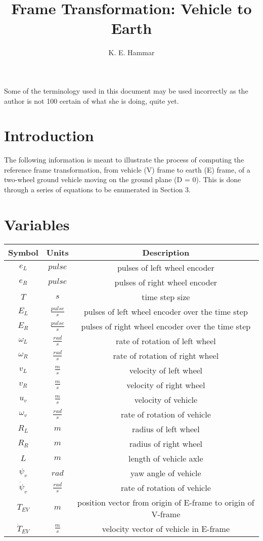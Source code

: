 \documentclass[12pt]{article}
\begin{document}
	\title{Frame Transformation: Vehicle to Earth}
	\author{K. E. Hammar}
	\maketitle
	Some of the terminology used in this document may be used incorrectly as the author is not 100\text{\%} certain of what she is doing, quite yet. 
	\section{Introduction}
		The following information is meant to illustrate the process of computing the reference frame transformation, from vehicle (V) frame to earth (E) frame, of a two-wheel ground vehicle moving on the ground plane (D = 0). This is done through a series of equations to be enumerated in Section 3.
	\section{Variables}
		\begin{table}[hbt]
			\begin{center}
				\begin{tabular}{|c|c|c|}
					\hline
					Symbol & Units & Description \\ \hline
					$e_L$ & $pulse$ & pulses of left wheel encoder\\
					$e_R$ & $pulse$ & pulses of right wheel encoder\\
					$T$ & $s$ & time step size\\
					$E_L$ & $\frac{pulse}{s}$ & pulses of left wheel encoder over the time step \\
					$E_R$ & $\frac{pulse}{s}$ & pulses of right wheel encoder over the time step \\
					$\omega_L$ & $\frac{rad}{s}$ &rate of rotation of left wheel \\
					$\omega_R$ & $\frac{rad}{s}$ & rate of rotation of right wheel \\
					$v_L$ & $\frac{m}{s}$ & velocity of left wheel \\
					$v_R$ & $\frac{m}{s}$ & velocity of right wheel \\
					$u_v$ & $\frac{m}{s}$ & velocity of vehicle \\
					$\omega_v$ & $\frac{rad}{s}$ & rate of rotation of vehicle \\
					$R_L$ & $m$ & radius of left wheel\\
					$R_R$ & $m$ & radius of right wheel\\
					$L$ & $m$ & length of vehicle axle\\
					$\psi_v$ & $rad$ & yaw angle of vehicle\\
					$\dot{\psi}_v$ & $\frac{rad}{s}$ & rate of rotation of vehicle \\ 
					$T_{EV}$ & $m$ & position vector from origin of E-frame to origin of V-frame\\
					$\dot{T}_{EV}$ & $\frac{m}{s}$ & velocity vector of vehicle in E-frame 
				\\ \hline
			\end{tabular}
			\end{center}
		\end{table}
\end{document}
